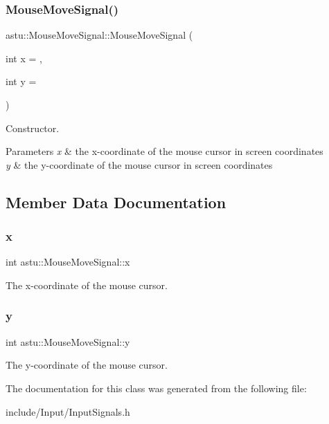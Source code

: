\subsubsection{\texorpdfstring{Mouse\+Move\+Signal()}{MouseMoveSignal()}}
{\footnotesize\ttfamily astu\+::\+Mouse\+Move\+Signal\+::\+Mouse\+Move\+Signal (\begin{DoxyParamCaption}\item[{int}]{x = {},  }\item[{int}]{y = {} }\end{DoxyParamCaption})\hspace{0.3cm}{\ttfamily [inline]}}

Constructor.


\begin{DoxyParams}{Parameters}
{\em x} & the x-\/coordinate of the mouse cursor in screen coordinates \\
\hline
{\em y} & the y-\/coordinate of the mouse cursor in screen coordinates \\
\hline
\end{DoxyParams}


\subsection{Member Data Documentation}
\mbox{\label{classastu_1_1MouseMoveSignal_a9d52ac7539de0cb742b6e3c0d699a471}} 
\subsubsection{\texorpdfstring{x}{x}}
{\footnotesize\ttfamily int astu\+::\+Mouse\+Move\+Signal\+::x}

The x-\/coordinate of the mouse cursor. \mbox{\label{classastu_1_1MouseMoveSignal_afc06dfa5666fb4760e42ab1e1cce7074}} 
\subsubsection{\texorpdfstring{y}{y}}
{\footnotesize\ttfamily int astu\+::\+Mouse\+Move\+Signal\+::y}

The y-\/coordinate of the mouse cursor. 

The documentation for this class was generated from the following file\+:\begin{DoxyCompactItemize}
\item 
include/\+Input/Input\+Signals.\+h\end{DoxyCompactItemize}

